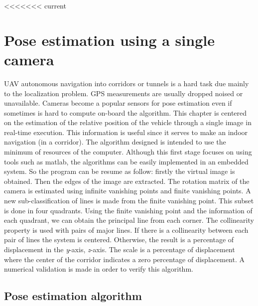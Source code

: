 <<<<<<< current
\chapter{Pose estimation using a single camera}%

\ifpdf
    \graphicspath{{Chapter3/Figs/Raster/}{Chapter3/Figs/PDF/}{Chapter3/Figs/}}
\else
    \graphicspath{{Chapter3/Figs/Vector/}{Chapter3/Figs/}}
\fi


UAV autonomous navigation into corridors or tunnels is a hard task due mainly to the localization problem. GPS measurements are usually dropped noised or unavailable. Cameras become a popular sensors for pose estimation even if sometimes is hard to compute on-board the algorithm. This chapter is centered on the estimation of the relative position of the vehicle through a single image in real-time execution. This information is useful since it serves to make an indoor navigation (in a corridor). The algorithm designed is intended to use the minimum of resources of the computer. Although this first stage focuses on using tools such as matlab, the algorithms can be easily implemented in an embedded system. So the program can be resume as follow: firstly the virtual image is obtained. Then the edges of the image are extracted.  The rotation %
matrix of the camera is estimated using infinite vanishing points and finite vanishing points. A new sub-classification of lines is made from the finite vanishing point. This subset is done in four quadrants. Using the finite vanishing point and the information of each quadrant, we can obtain the principal line from each corner. The collinearity property is used with pairs of major lines. If there is a collinearity between each pair of lines the system is centered. Otherwise, the result is a percentage of displacement in the \textit{y}-axis, \textit{z}-axis.  The scale is a percentage of displacement where the center of the corridor indicates a zero percentage of displacement. A numerical validation is made in order to verify this algorithm.

\section{Pose estimation algorithm}

